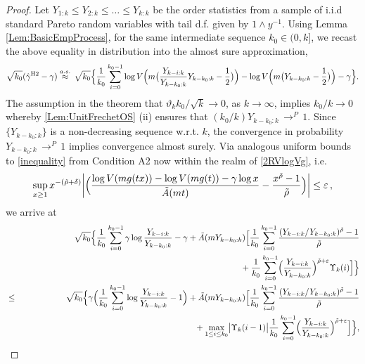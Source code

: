 \documentclass[11pt, a4paper, oneside]{article}
\numberwithin{equation}{section}
\theoremstyle{plain}
\theoremstyle{definition}
\newcommand{\sumab}[2]{\ensuremath{\sum\limits_{#1}^{#2}}}
\newcommand{\suprem}[1]{\ensuremath{\displaystyle {\sup_{#1}}}}
\newcommand{\conv}[1]{\ensuremath{\, \displaystyle {\mathop{\longrightarrow}^{#1}}}\, }
\begin{document}
\begin{proof}
\noindent Let $Y_{1:k} \leq Y_{2:k} \leq \dots \leq Y_{k:k}$ be the order statistics from a sample of i.i.d standard Pareto random variables with tail d.f. given by $1 \wedge y^{-1}$. Using Lemma \ref{Lem:BasicEmpProcess}, for the same intermediate sequence $k_0 \in (0, k]$, we recast the above equality in distribution into the almost sure approximation,
\begin{equation*}
	\sqrt{k_0} (\hat{\gamma}^{\textrm{H2}} - \gamma)  \stackrel{a.s.}{\approx} \, \sqrt{k_0} \Bigl\{ \frac{1}{k_0}\sumab{i=0}{k_0-1} \log V  \Bigr(m\bigl(\frac{Y_{k-i:k} }{Y_{k-k_{0}:k}} Y_{k-k_{0}:k}-\frac{1}{2}\bigl)\Bigr) - \log V \Bigl( m \bigl(Y_{k-k_{0}:k} - \frac{1}{2}\bigl) \Bigr)- \gamma\Bigr\}.
\end{equation*}
The assumption in the theorem that $\vartheta_k k_0/\sqrt{k} \rightarrow 0$, as $k \rightarrow \infty$, implies $k_0/k \rightarrow 0$ whereby \ref{Lem:UnitFrechetOS} (ii) ensures that $(k_0/k) Y_{k-k_0:k} \conv{P}1$. Since $ \{Y_{k-k_0:k}\}$ is a non-decreasing sequence w.r.t. $k$, the convergence in probability $Y_{k-k_0:k} \conv{P} 1$ implies convergence almost surely.
Via analogous uniform bounds to \eqref{inequality} from Condition A2 now within the realm of \eqref{2RVlogVg}, i.e.
\begin{equation*}
 \suprem{x\geq 1} \, x^{-(\tilde{\rho}+\delta)} \biggl|\Bigl(\frac{\log V(mg(tx))-\log V(mg(t))-\gamma \log x}{\tilde{A}(mt)}-\frac{x^{\tilde{\rho}}-1}{\tilde{\rho}}\Bigr)\biggr|\leq\varepsilon \,,
\end{equation*}
we arrive at
\begin{eqnarray}
\nonumber	 & & \sqrt{k_0} \Bigl\{ \frac{1}{k_0}\sumab{i=0}{k_0-1} \gamma \log \frac{Y_{k-i:k} }{Y_{k-k_{0}:k}} -\gamma + \tilde{A}(m Y_{k-k_{0}:k}) \Bigl[ \frac{1}{k_0}\sumab{i=0}{k_0-1}  \frac{(Y_{k-i:k} /Y_{k-k_{0}:k})^{\tilde{\rho}}-1}{\tilde{\rho}}\\
\nonumber  & & \mbox{\hspace{9cm}}+ \frac{1}{k_0}\sumab{i=0}{k_0-1} \Bigl( \frac{Y_{k-i:k} }{Y_{k-k_{0}:k}} \Bigr)^{\tilde{\rho}+ \varepsilon} \Upsilon_k(i)   \Bigr] \Bigr\}\\
\nonumber & \leq & \sqrt{k_0} \Bigl\{ \gamma \Bigl(\frac{1}{k_0}\sumab{i=0}{k_0-1} \log \frac{Y_{k-i:k} }{Y_{k-k_{0}:k}} -1 \Bigr) + \tilde{A}(m Y_{k-k_{0}:k}) \Bigl[ \frac{1}{k_0}\sumab{i=0}{k_0-1}  \frac{(Y_{k-i:k} /Y_{k-k_{0}:k})^{\tilde{\rho}}-1}{\tilde{\rho}}\\
  & & \mbox{\hspace{6.5cm}}  + \max_{1\leq i \leq k_0} \bigl|\Upsilon_k(i-1)\bigr| \frac{1}{k_0}\sumab{i=0}{k_0-1} \Bigl( \frac{Y_{k-i:k} }{Y_{k-k_{0}:k}} \Bigr)^{\tilde{\rho}+ \varepsilon}    \Bigr] \Bigr\}, \label{eq:UBoundRand}

\end{eqnarray}
\end{proof}
\end{document}
